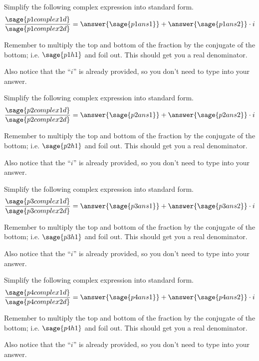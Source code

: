 \documentclass{ximera}
\begin{document}
\begin{problem}
    Simplify the following complex expression into standard form.
    \[
        \frac{\sage{p1complex1d}}{\sage{p1complex2d}} = \answer{\sage{p1ans1}} + \answer{\sage{p1ans2}}\cdot i
    \]
    \begin{feedback}
        Remember to multiply the top and bottom of the fraction by the conjugate of the bottom; i.e. $\sage{p1h1}$ and foil out. This should get you a real denominator.
        
        Also notice that the ``$i$'' is already provided, so you don't need to type into your answer.
    \end{feedback}
    
\end{problem}


\begin{problem}
    Simplify the following complex expression into standard form.
    \[
        \frac{\sage{p2complex1d}}{\sage{p2complex2d}} = \answer{\sage{p2ans1}} + \answer{\sage{p2ans2}}\cdot i
    \]
    \begin{feedback}
        Remember to multiply the top and bottom of the fraction by the conjugate of the bottom; i.e. $\sage{p2h1}$ and foil out. This should get you a real denominator.
        
        Also notice that the ``$i$'' is already provided, so you don't need to type into your answer.
    \end{feedback}
    
\end{problem}


\begin{problem}
    Simplify the following complex expression into standard form.
    \[
        \frac{\sage{p3complex1d}}{\sage{p3complex2d}} = \answer{\sage{p3ans1}} + \answer{\sage{p3ans2}}\cdot i
    \]
    \begin{feedback}
        Remember to multiply the top and bottom of the fraction by the conjugate of the bottom; i.e. $\sage{p3h1}$ and foil out. This should get you a real denominator.
        
        Also notice that the ``$i$'' is already provided, so you don't need to type into your answer.
    \end{feedback}
    
\end{problem}


\begin{problem}
    Simplify the following complex expression into standard form.
    \[
        \frac{\sage{p4complex1d}}{\sage{p4complex2d}} = \answer{\sage{p4ans1}} + \answer{\sage{p4ans2}}\cdot i
    \]
    \begin{feedback}
        Remember to multiply the top and bottom of the fraction by the conjugate of the bottom; i.e. $\sage{p4h1}$ and foil out. This should get you a real denominator.
        
        Also notice that the ``$i$'' is already provided, so you don't need to type into your answer.
    \end{feedback}
    
\end{problem}
\end{document}
